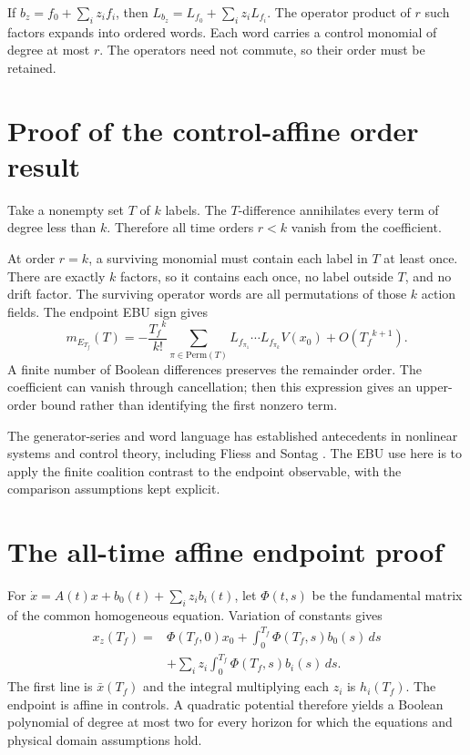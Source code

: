 If $b_z=f_0+\sum_i z_i f_i$, then $L_{b_z}=L_{f_0}+\sum_i z_iL_{f_i}$. The operator product of $r$ such factors expands into ordered words. Each word carries a control monomial of degree at most $r$. The operators need not commute, so their order must be retained.

\section{Proof of the control-affine order result}
Take a nonempty set $T$ of $k$ labels. The $T$-difference annihilates every term of degree less than $k$. Therefore all time orders $r<k$ vanish from the coefficient.

At order $r=k$, a surviving monomial must contain each label in $T$ at least once. There are exactly $k$ factors, so it contains each once, no label outside $T$, and no drift factor. The surviving operator words are all permutations of those $k$ action fields. The endpoint EBU sign gives
\begin{equation}
 m_{E_{T_f}}(T)=-\frac{{T_f}^k}{k!}
 \sum_{\pi\in\mathrm{Perm}(T)}
 L_{f_{\pi_1}}\cdots L_{f_{\pi_k}}V(x_0)
 +O({T_f}^{k+1}).
\end{equation}
A finite number of Boolean differences preserves the remainder order. The coefficient can vanish through cancellation; then this expression gives an upper-order bound rather than identifying the first nonzero term.

The generator-series and word language has established antecedents in nonlinear systems and control theory, including Fliess and Sontag \cite{fliess,sontag}. The EBU use here is to apply the finite coalition contrast to the endpoint observable, with the comparison assumptions kept explicit.

\section{The all-time affine endpoint proof}
For $\dot x=A(t)x+b_0(t)+\sum_i z_ib_i(t)$, let $\Phi(t,s)$ be the fundamental matrix of the common homogeneous equation. Variation of constants gives
\begin{align}
 x_z({T_f})={}&\Phi({T_f},0)x_0+
 \int_0^{T_f}\Phi({T_f},s)b_0(s)\,ds\nonumber\\
 &+\sum_i z_i\int_0^{T_f}\Phi({T_f},s)b_i(s)\,ds.
\end{align}
The first line is $\bar x({T_f})$ and the integral multiplying each $z_i$ is $h_i({T_f})$. The endpoint is affine in controls. A quadratic potential therefore yields a Boolean polynomial of degree at most two for every horizon for which the equations and physical domain assumptions hold.

